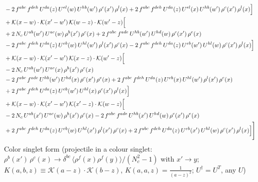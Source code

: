 \documentclass[9pt]{article}
\numberwithin{equation}{section}
\newcommand{\new}[1]{{\color{blue}#1}}
\begin{document}
\begin{align}
& -2\,f^{abc}\,f^{deh}\,U^{da}(z)\,U^{el}(w)\,U^{hb}(w')\,\rho^{c}(x')\,\rho^{l}(x) +2\,f^{abc}\,f^{deh}\,U^{da}(z)\,U^{el}(x)\,U^{hb}(w')\,\rho^{c}(x')\,\rho^{l}(x)\Big]\notag\\
& +\mathcal{K}(x-w)\cdot\mathcal{K}(x'-w')\,\mathcal{K}(w-z)\cdot\mathcal{K}(w'-z)\Big[\notag\\
& +2\,N_{c}\,U^{ab}(w')\,U^{ac}(w)\,\rho^{b}(x')\,\rho^{c}(x) +2\,f^{abc}\,f^{ade}\,U^{hb}(w')\,U^{hd}(w)\,\rho^{c}(x')\,\rho^{e}(x)\notag\\
& -2\,f^{abc}\,f^{deh}\,U^{da}(z)\,U^{eb}(w)\,U^{hl}(w')\,\rho^{l}(x')\,\rho^{c}(x) -2\,f^{abc}\,f^{deh}\,U^{da}(z)\,U^{eb}(w')\,U^{hl}(w)\,\rho^{c}(x')\,\rho^{l}(x)\Big]\notag\\
& +\mathcal{K}(x-w)\cdot\mathcal{K}(x'-w')\,\mathcal{K}(x-z)\cdot\mathcal{K}(w'-z)\Big[\notag\\
& -2\,N_{c}\,U^{ab}(w')\,U^{ac}(x)\,\rho^{b}(x')\,\rho^{c}(x)\notag\\
& -2\,f^{abc}\,f^{ade}\,U^{hb}(w')\,U^{hd}(x)\,\rho^{c}(x')\,\rho^{e}(x) +2\,f^{abc}\,f^{deh}\,U^{da}(z)\,U^{eb}(x)\,U^{hl}(w')\,\rho^{l}(x')\,\rho^{c}(x)\notag\\
& +2\,f^{abc}\,f^{deh}\,U^{da}(z)\,U^{eb}(w')\,U^{hl}(x)\,\rho^{c}(x')\,\rho^{l}(x)\Big]\notag\\
& +\mathcal{K}(x-w)\cdot\mathcal{K}(x'-w')\,\mathcal{K}(x'-z)\cdot\mathcal{K}(w-z)\Big[\notag\\
& -2\,N_{c}\,U^{ab}(x')\,U^{ac}(w)\,\rho^{b}(x')\,\rho^{c}(x) -2\,f^{abc}\,f^{ade}\,U^{hb}(x')\,U^{hd}(w)\,\rho^{c}(x')\,\rho^{e}(x)\notag\\
& +2\,f^{abc}\,f^{deh}\,U^{da}(z)\,U^{eb}(w)\,U^{hl}(x')\,\rho^{l}(x')\,\rho^{c}(x) +2\,f^{abc}\,f^{deh}\,U^{da}(z)\,U^{eb}(x')\,U^{hl}(w)\,\rho^{c}(x')\,\rho^{l}(x)\Big]\Bigg]
\end{align}
Color singlet form \new{(projectile in a colour singlet: $\rho^b(x')\,\rho^c(x)\to\delta^{bc}\,\langle\rho^f(x)\rho^f(y)\rangle/(N_c^2-1)$ with $x'\to y$; $K(a,b,z)\equiv\mathcal K(a-z)\cdot\mathcal K(b-z)$, $K(a,a,z)=\frac{1}{(a-z)^2}$; $U^\dagger=U^T$, any $U$)}
\end{document}
